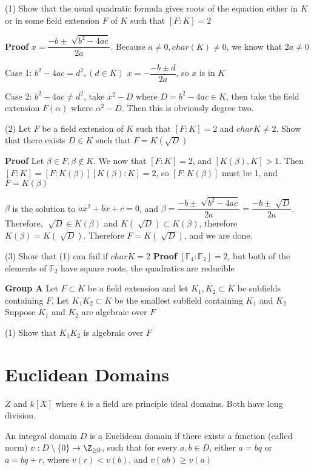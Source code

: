 \documentclass[10pt]{article}
\newcommand{\F}{\mathbb{F}}
\begin{document}
(1) Show that the usual quadratic formula gives roots of the equation either in $K$ or in some field extension $F$ of $K$ such that $[F : K] = 2$

\textbf{Proof} $x = \dfrac{- b \pm \sqrt[]{b^2 - 4ac}}{2a}$. Because $a\neq 0, char(K) \neq 0$, we know that $2a \neq 0$

Case 1: $b^2 - 4ac = d^2, (d \in K)$ $x = - \dfrac{- b \pm d}{2a}$, so $x$ is in $K$

Case 2: $b^2 - 4ac \neq d^2$, take $x^2 - D$ where $D = b^2 - 4ac \in K$, then take the field extension $F(\alpha)$ where $\alpha^2 - D$. Then this is obviously degree two.

(2) Let $F$ be a field extension of $K$ such that $[F: K] = 2$ and $charK \neq 2$. Show that there exists $D \in K$ such that $F = K(\sqrt{D})$

\textbf{Proof} Let $\beta \in F, \beta \not \in K$. We now that $[F : K] = 2$, and $[K(\beta), K] > 1$. Then $[F: K] = [F : K(\beta)][K(\beta): K] = 2$, so $[F : K(\beta)]$ must be 1, and $F = K(\beta)$

$\beta$ is the solution to $ax^2 + bx + c = 0$, and $\beta = \dfrac{-b \pm \sqrt[]{b^2 - 4ac}}{2a} = \dfrac{-b \pm \sqrt[]{D}}{2a}$. Therefore, $\sqrt[]{D} \in K(\beta)$ and $K(\sqrt[]{D}) \subset K(\beta)$, therefore $K(\beta) = K(\sqrt[]{D})$. Therefore $F = K(\sqrt[]{D})$, and we are done.

(3) Show that (1) can fail if $charK = 2$
\textbf{Proof} $[\F_4 : \F_2] = 2$, but both of the elements of $\F_2$ have square roots, the quadratics are reducible

\textbf{Group A}
Let $F \subset K$ be a field extension and let $K_1, K_2 \subset K$ be subfields containing $F$, Let $K_1K_2 \subset K$ be the smallest subfield containing $K_1$ and $K_2$ Suppose $K_1$ and $K_2$ are algebraic over $F$

(1) Show that $K_1K_2$ is algebraic over $F$

\section{Euclidean Domains}
$Z$ and $k[X]$ where $k$ is a field are principle ideal domains. 
Both have long division. 

\begin{defn}
    An integral domain $D$ is a Euclidean domain if there exists a function (called norm) $v: D\setminus\{0\} \to \Z_{\geq 0}$, such that for every $a, b \in D$, either $a = bq$ or $a = bq + r$, where $v(r) < v(b)$, and $v(ab) \geq v(a)$
\end{defn}
\end{document}
